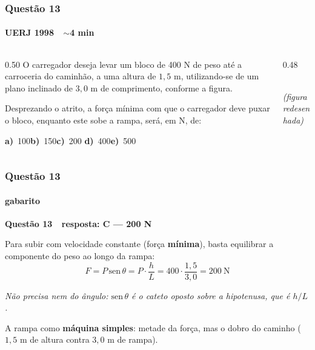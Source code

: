 \documentclass[aspectratio=169,12pt]{beamer}
\newcommand{\alternativascurtas}[5]{%
  \par\vspace{0.7em}%
  \noindent\textbf{a)}~#1\hfill\textbf{b)}~#2\hfill\textbf{c)}~#3%
  \hfill\textbf{d)}~#4\hfill\textbf{e)}~#5\par}
\newcommand{\resposta}[2]{%
  \par\vspace{0.2em}
  {\Large\bfseries\color{vinho}Quest\~ao #1 \,\textemdash\, resposta: #2}
  \par\vspace{0.6em}}
\begin{document}
\begin{frame}
\frametitle{Quest\~ao 13}
\framesubtitle{UERJ 1998 \,\textperiodcentered\, $\sim$4 min}

\begin{columns}[T]
\begin{column}{0.50\textwidth}
\small
O carregador deseja levar um bloco de 400 N de peso at\'e a
carroceria do caminh\~ao, a uma altura de $1{,}5$ m, utilizando-se de
um plano inclinado de $3{,}0$ m de comprimento, conforme a figura.

\vspace{0.4em}
Desprezando o atrito, a for\c{c}a m\'inima com que o
carregador deve puxar o bloco, enquanto este sobe a rampa, ser\'a, em
N, de:

\alternativascurtas{100}{150}{200}{400}{500}
\end{column}
\begin{column}{0.48\textwidth}
\centering
{}\\[0.3em]
{\scriptsize\itshape (figura redesenhada)}
\end{column}
\end{columns}
\end{frame}

\begin{frame}
\frametitle{Quest\~ao 13}
\framesubtitle{gabarito}
\resposta{13}{C --- 200 N}

Para subir com velocidade constante (for\c{c}a \textbf{m\'inima}),
basta equilibrar a componente do peso ao longo da rampa:
\[ F = P\,\mathrm{sen}\,\theta = P\cdot\frac{h}{L}
     = 400\cdot\frac{1{,}5}{3{,}0} = 200\ \text{N} \]

\vspace{0.4em}
{\color{grafite}\itshape N\~ao precisa nem do \^angulo: $\mathrm{sen}\,
\theta$ \'e o cateto oposto sobre a hipotenusa, que \'e $h/L$.}

\vspace{0.5em}
A rampa como \textbf{m\'aquina simples}: metade da for\c{c}a, mas o
dobro do caminho ($1{,}5$ m de altura contra $3{,}0$ m de rampa).
\end{frame}
\end{document}
